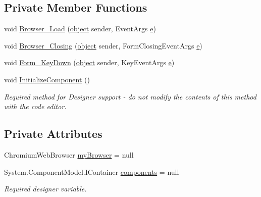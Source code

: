 \subsection*{Private Member Functions}
\begin{DoxyCompactItemize}
\item 
void \hyperlink{class_web_analyzer_1_1_u_i_1_1_edit_application_settings_a9c2c0bc93ba5e8100ee1c519dcce02cf}{Browser\+\_\+\+Load} (\hyperlink{_u_i_2_h_t_m_l_resources_2js_2lib_2underscore_8min_8js_aae18b7515bb2bc4137586506e7c0c903}{object} sender, Event\+Args \hyperlink{_u_i_2_h_t_m_l_resources_2js_2lib_2bootstrap_8min_8js_ab5902775854a8b8440bcd25e0fe1c120}{e})
\item 
void \hyperlink{class_web_analyzer_1_1_u_i_1_1_edit_application_settings_aa528cfa638e838d11b10ec08fa5181d2}{Browser\+\_\+\+Closing} (\hyperlink{_u_i_2_h_t_m_l_resources_2js_2lib_2underscore_8min_8js_aae18b7515bb2bc4137586506e7c0c903}{object} sender, Form\+Closing\+Event\+Args \hyperlink{_u_i_2_h_t_m_l_resources_2js_2lib_2bootstrap_8min_8js_ab5902775854a8b8440bcd25e0fe1c120}{e})
\item 
void \hyperlink{class_web_analyzer_1_1_u_i_1_1_edit_application_settings_a0922e68f2b3e1843ec5ce70b242d5903}{Form\+\_\+\+Key\+Down} (\hyperlink{_u_i_2_h_t_m_l_resources_2js_2lib_2underscore_8min_8js_aae18b7515bb2bc4137586506e7c0c903}{object} sender, Key\+Event\+Args \hyperlink{_u_i_2_h_t_m_l_resources_2js_2lib_2bootstrap_8min_8js_ab5902775854a8b8440bcd25e0fe1c120}{e})
\item 
void \hyperlink{class_web_analyzer_1_1_u_i_1_1_edit_application_settings_a177e4cd05025bd9306235154532f5f9f}{Initialize\+Component} ()
\begin{DoxyCompactList}\small\item\em Required method for Designer support -\/ do not modify the contents of this method with the code editor. \end{DoxyCompactList}\end{DoxyCompactItemize}
\subsection*{Private Attributes}
\begin{DoxyCompactItemize}
\item 
Chromium\+Web\+Browser \hyperlink{class_web_analyzer_1_1_u_i_1_1_edit_application_settings_a13a4f8fb22ec5f36f5824f489231ed85}{my\+Browser} = null
\item 
System.\+Component\+Model.\+I\+Container \hyperlink{class_web_analyzer_1_1_u_i_1_1_edit_application_settings_a18d0528816ebe31ee05cb07f51df87d6}{components} = null
\begin{DoxyCompactList}\small\item\em Required designer variable. \end{DoxyCompactList}\end{DoxyCompactItemize}


